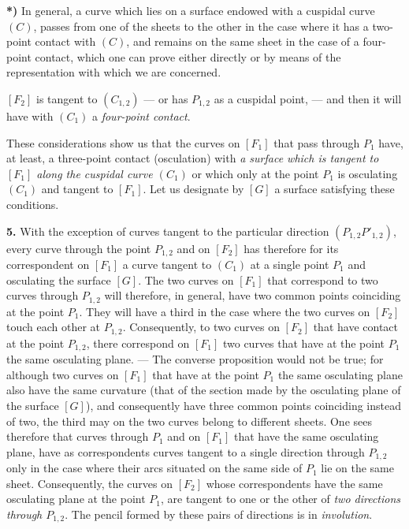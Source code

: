\documentclass{article}
\begin{document}
\textbf{*)} In general, a curve which lies on a surface endowed with a cuspidal curve $(C)$, passes from one of the sheets to the other in the case where it has a two-point contact with $(C)$, and remains on the same sheet in the case of a four-point contact, which one can prove either directly or by means of the representation with which we are concerned.

$[F_2]$ is tangent to $(C_{1, 2})$ --- or has $P_{1, 2}$ as a cuspidal point, --- and then it will have with $(C_1)$ a \emph{four-point contact}.

These considerations show us that the curves on $[F_1]$ that pass through $P_1$ have, at least, a three-point contact (osculation) with \emph{a surface which is tangent to $[F_1]$ along the cuspidal curve $(C_1)$} or which only at the point $P_1$ is osculating $(C_1)$ and tangent to $[F_1]$. Let us designate by $[G]$ a surface satisfying these conditions.

\textbf{5.} With the exception of curves tangent to the particular direction $(P_{1, 2} P'_{1, 2})$, every curve through the point $P_{1, 2}$ and on $[F_2]$ has therefore for its correspondent on $[F_1]$ a curve tangent to $(C_1)$ at a single point $P_1$ and osculating the surface $[G]$. The two curves on $[F_1]$ that correspond to two curves through $P_{1, 2}$ will therefore, in general, have two common points coinciding at the point $P_1$. They will have a third in the case where the two curves on $[F_2]$ touch each other at $P_{1, 2}$. Consequently, to two curves on $[F_2]$ that have contact at the point $P_{1, 2}$, there correspond on $[F_1]$ two curves that have at the point $P_1$ the same osculating plane. --- The converse proposition would not be true; for although two curves on $[F_1]$ that have at the point $P_1$ the same osculating plane also have the same curvature (that of the section made by the osculating plane of the surface $[G]$), and consequently have three common points coinciding instead of two, the third may on the two curves belong to different sheets. One sees therefore that curves through $P_1$ and on $[F_1]$ that have the same osculating plane, have as correspondents curves tangent to a single direction through $P_{1, 2}$ only in the case where their arcs situated on the same side of $P_1$ lie on the same sheet. Consequently, the curves on $[F_2]$ whose correspondents have the same osculating plane at the point $P_1$, are tangent to one or the other of \emph{two directions through $P_{1, 2}$}. The pencil formed by these pairs of directions is in \emph{involution}.
\end{document}
